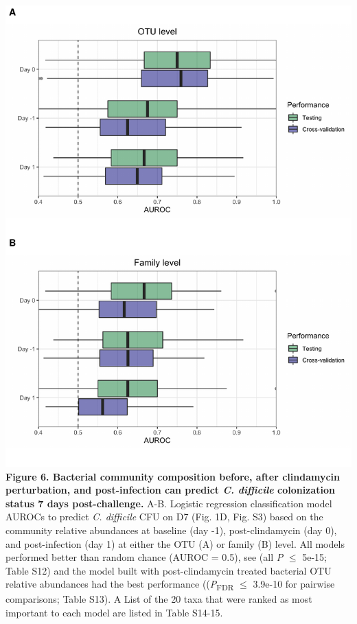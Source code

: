 \documentclass[11pt,]{article}
\begin{document}
\includegraphics{figure_6.pdf} \textbf{Figure 6. Bacterial community
composition before, after clindamycin perturbation, and post-infection
can predict \emph{C. difficile} colonization status 7 days
post-challenge.} A-B. Logistic regression classification model AUROCs to
predict \emph{C. difficile} CFU on D7 (Fig. 1D, Fig. S3) based on the
community relative abundances at baseline (day -1), post-clindamycin
(day 0), and post-infection (day 1) at either the OTU (A) or family (B)
level. All models performed better than random chance (AUROC = 0.5), see
(all \emph{P} \(\le\) 5e-15; Table S12) and the model built with
post-clindamycin treated bacterial OTU relative abundances had the best
performance ((\emph{P}\textsubscript{FDR} \(\le\) 3.9e-10 for pairwise
comparisons; Table S13). A List of the 20 taxa that were ranked as most
important to each model are listed in Table S14-15.

\newpage
\end{document}
